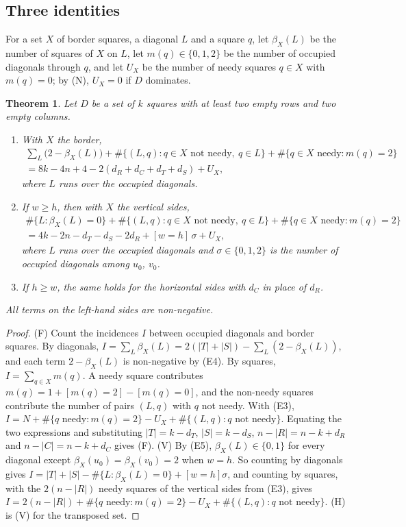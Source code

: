 \documentclass[11pt]{article}
\newtheorem{theorem}{Theorem}[section]
\theoremstyle{definition}
\theoremstyle{remark}
\newcommand{\dR}{d_R}
\newcommand{\dC}{d_C}
\newcommand{\dT}{d_T}
\newcommand{\dS}{d_S}
\begin{document}
\subsection{Three identities}

For a set $X$ of border squares, a diagonal $L$ and a square $q$, let $\beta_X(L)$ be the number of squares
of $X$ on $L$, let $m(q)\in\{0,1,2\}$ be the number of occupied diagonals through $q$, and let $U_X$ be the
number of needy squares $q\in X$ with $m(q)=0$; by (N), $U_X=0$ if $D$ dominates.

\begin{theorem}\label{thm:identities}
Let $D$ be a set of $k$ squares with at least two empty rows and two empty columns.
\begin{enumerate}
\item[(F)] With $X$ the border,
\begin{multline*}
  \sum_{L}\bigl(2-\beta_X(L)\bigr)+\#\{(L,q):q\in X\text{ not needy},\ q\in L\}+\#\{q\in X\text{ needy}: m(q)=2\}\\
  = 8k-4n+4-2(\dR+\dC+\dT+\dS)+U_X,
\end{multline*}
where $L$ runs over the occupied diagonals.
\item[(V)] If $w\ge h$, then with $X$ the vertical sides,
\begin{multline*}
  \#\{L:\beta_X(L)=0\}+\#\{(L,q):q\in X\text{ not needy},\ q\in L\}+\#\{q\in X\text{ needy}: m(q)=2\}\\
  = 4k-2n-\dT-\dS-2\dR+[w=h]\,\sigma+U_X,
\end{multline*}
where $L$ runs over the occupied diagonals and $\sigma\in\{0,1,2\}$ is the number of occupied diagonals
among $u_0$, $v_0$.
\item[(H)] If $h\ge w$, the same holds for the horizontal sides with $\dC$ in place of $\dR$.
\end{enumerate}
All terms on the left-hand sides are non-negative.
\end{theorem}
\begin{proof}
(F) Count the incidences $I$ between occupied diagonals and border squares. By diagonals,
$I=\sum_L\beta_X(L)=2(|T|+|S|)-\sum_L(2-\beta_X(L))$, and each term $2-\beta_X(L)$ is non-negative by
(E4). By squares, $I=\sum_{q\in X}m(q)$. A needy square contributes
$m(q)=1+[m(q)=2]-[m(q)=0]$, and the non-needy squares contribute the number of pairs $(L,q)$ with $q$ not
needy. With (E3), $I=N+\#\{q\text{ needy}:m(q)=2\}-U_X+\#\{(L,q):q\text{ not needy}\}$. Equating the two
expressions and substituting $|T|=k-\dT$, $|S|=k-\dS$, $n-|R|=n-k+\dR$ and $n-|C|=n-k+\dC$ gives (F).
(V) By (E5), $\beta_X(L)\in\{0,1\}$ for every diagonal except $\beta_X(u_0)=\beta_X(v_0)=2$ when $w=h$. So
counting by diagonals gives $I=|T|+|S|-\#\{L:\beta_X(L)=0\}+[w=h]\sigma$, and counting by squares, with
the $2(n-|R|)$ needy squares of the vertical sides from (E3), gives
$I=2(n-|R|)+\#\{q\text{ needy}:m(q)=2\}-U_X+\#\{(L,q):q\text{ not needy}\}$. (H) is (V) for the
transposed set.
\end{proof}
\end{document}
